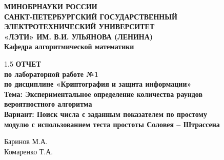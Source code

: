 \documentclass[14pt,a4paper]{extarticle}
\begin{document}
\justifying

\begin{titlepage}
    \fontsize{14pt}{16pt}\selectfont
    
    \begin{center}
        \textbf{МИНОБРНАУКИ РОССИИ} \\
        \textbf{САНКТ-ПЕТЕРБУРГСКИЙ ГОСУДАРСТВЕННЫЙ} \\
        \textbf{ЭЛЕКТРОТЕХНИЧЕСКИЙ УНИВЕРСИТЕТ} \\
        \textbf{«ЛЭТИ» ИМ. В.И. УЛЬЯНОВА (ЛЕНИНА)} \\
        \textbf{Кафедра алгоритмической математики}
    \end{center}

    \vspace{3cm}

       \begin{center}
        \begin{spacing}{1.5}
            \textbf{ОТЧЕТ} \\
            \textbf{по лабораторной работе №1} \\
            \textbf{по дисциплине «Криптография и защита информации»} \\
            \textbf{Тема: Экспериментальное определение количества раундов} \\
            \textbf{вероятностного алгоритма} \\
            \textbf{Вариант: Поиск числа с заданным показателем по простому} \\
            \textbf{модулю с использованием теста простоты Соловея – Штрассена}
        \end{spacing}
    \end{center}
    \vfill

    \noindent
     \hfill \underline{\hspace{6cm}} \hspace{0.3cm} Баринов М.А. \\[0.3cm]
    \noindent
     \hfill \underline{\hspace{6cm}} \hspace{0.3cm} Комаренко Т.А.

    \vspace{1cm}


\end{titlepage}
\end{document}
